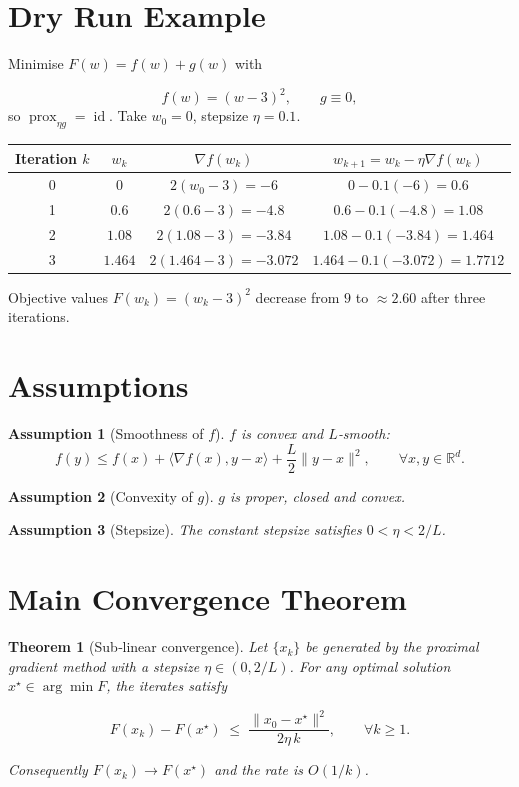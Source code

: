 \documentclass{article}
\newtheorem{theorem}{Theorem}
\newtheorem{assumption}{Assumption}
\newcommand{\prox}{\operatorname{prox}}
\begin{document}
\section*{Dry Run Example}
Minimise $F(w)=f(w)+g(w)$ with  

\[
f(w)=(w-3)^{2},\qquad g\equiv0,
\]
so $\prox_{\eta g}= \operatorname{id}$.  
Take $w_{0}=0$, stepsize $\eta=0.1$.

\begin{tabular}{c|c|c|c}
Iteration $k$ & $w_{k}$ & $\nabla f(w_{k})$ & $w_{k+1}=w_{k}-\eta\nabla f(w_{k})$\\ \hline
0 & $0$ & $2(w_{0}-3)=-6$ & $0-0.1(-6)=0.6$\\
1 & $0.6$ & $2(0.6-3)=-4.8$ & $0.6-0.1(-4.8)=1.08$\\
2 & $1.08$ & $2(1.08-3)=-3.84$ & $1.08-0.1(-3.84)=1.464$\\
3 & $1.464$ & $2(1.464-3)=-3.072$ & $1.464-0.1(-3.072)=1.7712$
\end{tabular}

Objective values $F(w_{k})=(w_{k}-3)^{2}$ decrease from $9$ to $\approx2.60$ after three iterations.

\section*{Assumptions}
\begin{assumption}[Smoothness of $f$]\label{ass:smooth}
$f$ is convex and $L$‑smooth:
\[
f(y)\le f(x)+\langle\nabla f(x),y-x\rangle+\frac{L}{2}\|y-x\|^{2},
\qquad\forall x,y\in\mathbb{R}^{d}.
\]
\end{assumption}
\begin{assumption}[Convexity of $g$]\label{ass:convex}
$g$ is proper, closed and convex.
\end{assumption}
\begin{assumption}[Stepsize]\label{ass:stepsize}
The constant stepsize satisfies $0<\eta<2/L$.
\end{assumption}

\section*{Main Convergence Theorem}
\begin{theorem}[Sub‑linear convergence]\label{thm:main}
Let $\{x_{k}\}$ be generated by the proximal gradient method with a stepsize $\eta\in(0,2/L)$.  
For any optimal solution $x^{\star}\in\arg\min F$, the iterates satisfy  

\[
F(x_{k})-F(x^{\star})\;\le\;
\frac{\|x_{0}-x^{\star}\|^{2}}{2\eta\,k},
\qquad\forall k\ge1.
\]

Consequently $F(x_{k})\to F(x^{\star})$ and the rate is $O(1/k)$.
\end{theorem}
\end{document}
